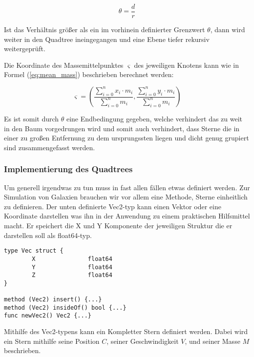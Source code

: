 \begin{equation} \label{eq:barnes_hut} \theta = \frac{d}{r} \end{equation}

Ist das Verhältnis größer als ein im vorhinein definierter Grenzwert \( \theta
\), dann wird weiter in den Quadtree ineingegangen und eine Ebene tiefer
rekursiv weitergeprüft.

Die Koordinate des Massemittelpunktes \( \varsigma \) des jeweiligen Knotens
kann wie in Formel (\ref{eq:mean_mass}) beschrieben berechnet werden:

\begin{equation} \label{eq:mean_mass}
\varsigma = \left( \dfrac{ \displaystyle \sum_{i=0}^{n} x_i \cdot m_i }{
\displaystyle \sum_{i=0}^{n} m_i } , \frac{ \displaystyle \sum_{i=0}^{n} y_i
\cdot m_i }{ \displaystyle \sum_{i=0}^{n} m_i } \right)
\end{equation}

Es ist somit durch \( \theta \) eine Endbedingung gegeben, welche verhindert
das zu weit in den Baum vorgedrungen wird und somit auch verhindert, dass
Sterne die in einer zu großen Entfernung zu dem ursprungssten liegen und dicht
genug grupiert sind zusammengefasst werden.

\subsubsection{Implementierung des Quadtrees}
Um generell irgendwas zu tun muss in fast allen fällen etwas definiert werden.
Zur Simulation von Galaxien brauchen wir vor allem eine Methode, Sterne
einheitlich zu definieren. Der unten definierte Vec2-typ kann einen Vektor oder
eine Koordinate darstellen was ihn in der Anwendung zu einem praktischen
Hilfsmittel macht.  Er speichert die X und Y Komponente der jeweiligen Struktur
die er darstellen soll als float64-typ.

\begin{lstlisting}
type Vec struct {
        X               float64
        Y               float64
        Z               float64
}

method (Vec2) insert() {...}
method (Vec2) insideOf() bool {...}
func newVec2() Vec2 {...}
\end{lstlisting}

Mithilfe des Vec2-typens kann ein Kompletter Stern definiert werden. Dabei wird
ein Stern mithilfe seine Position \( C \), seiner Geschwindigkeit \( V \), und
seiner Masse \( M \) beschrieben.

